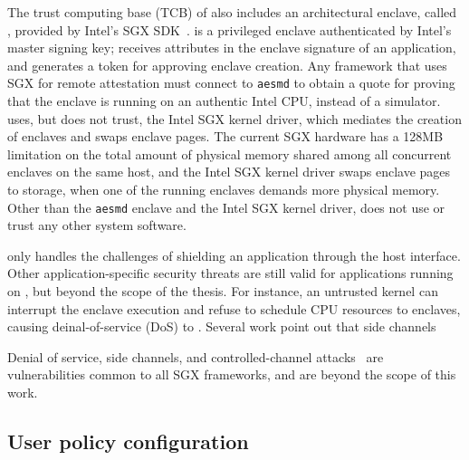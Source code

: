 The trust computing base (TCB) of \graphenesgx{} also includes
an architectural enclave,
called , provided by Intel's SGX SDK~\cite{intel-sgx-linux-sdk}.
 is a privileged enclave
authenticated by Intel's master signing key;
 receives attributes in the enclave signature of an application,
and generates a token for approving enclave creation.
Any framework that uses SGX for remote attestation must connect to {\tt aesmd}
to obtain a quote for proving that the enclave is running on an authentic Intel CPU, instead of a simulator. 
\graphenesgx{} uses, but does not trust, the Intel SGX kernel driver, which mediates the creation of enclaves and swaps enclave pages.
The current SGX hardware
has a 128MB limitation on the total amount of physical memory shared among all concurrent enclaves on the same host,
and the Intel SGX kernel driver swaps enclave pages to storage,
when one of the running enclaves demands more
physical memory.
Other than the {\tt aesmd} enclave and the Intel SGX kernel driver, \graphenesgx{} does not use or trust any other system software.



\graphenesgx{} only handles the challenges of shielding an application through the host interface.
Other application-specific security threats
are still valid for applications running on \graphenesgx{}, but beyond the scope of the thesis.
For instance, an untrusted kernel
can interrupt the enclave execution and refuse to schedule CPU resources to enclaves,
causing deinal-of-service (DoS) to \graphenesgx{}.
Several work point out that
side channels

Denial of service, side channels, and controlled-channel attacks~\cite{xu15controlledchannel}
are vulnerabilities common to all SGX frameworks, and 
are beyond the scope of this work.



\subsection{User policy configuration}
\label{sec:sgx:overview:config}


